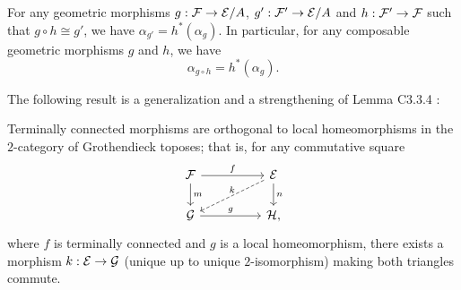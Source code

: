 \documentclass[a4paper,12pt]{article}
\begin{document}
\begin{remark}\label{remlemmaslice}
	For any geometric morphisms $g:{\cal F}\to {\cal E}\slash A$, $g':{\cal F}'\to {\cal E}\slash A$ and $h:{\cal F}'\to {\cal F}$ such that $g\circ h\cong g'$, we have $\alpha_{g'}=h^{\ast}(\alpha_{g})$. In particular, for any composable geometric morphisms $g$ and $h$, we have
	\[
	\alpha_{g\circ h}=h^{\ast}(\alpha_{g}).
	\] 
\end{remark}

The following result is a generalization and a strengthening of Lemma C3.3.4 \cite{El}: 

\begin{proposition}\label{proporthogonality}
Terminally connected morphisms are orthogonal to local homeomorphisms
in the $2$-category of Grothendieck toposes; that is, for any commutative square
\begin{equation*}
\begin{tikzcd}
{\cal F} \arrow[rr, "f"]   \arrow[d, "m"]   & &  {\cal E} \arrow[d, "n"] \arrow[dll, dashed, "k"{above}]  \\
{\cal G} \ar[rr, "g"] & & {\cal H},   
\end{tikzcd}
\end{equation*}	
where $f$ is terminally connected and $g$ is a local homeomorphism, there exists a morphism $k:{\cal E}\to {\cal G}$ (unique up
to unique $2$-isomorphism) making both triangles commute. 	
\end{proposition}
\end{document}
